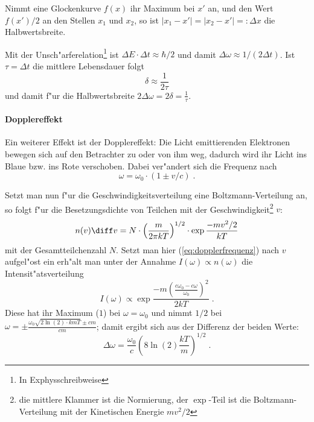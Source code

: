 \documentclass[a4paper,draft]{article}
\begin{document}
\begin{Def}
  [Halbwertsbreite]
Nimmt eine Glockenkurve $f(x)$ ihr Maximum bei $x'$ an, und den Wert
$f(x')/2$ an den Stellen $x_1$ und $x_2$, so ist $|x_1-x'| = |x_2-x'|
=: \Delta x$ die Halbwertsbreite.
\end{Def}

Mit der Unsch"arferelation\footnote{In Exphysschreibweise} ist
$\Delta  E \cdot \Delta t \approx \hbar / 2$ und damit $\Delta
\omega \approx 1/(2\Delta t)$. Ist $\tau = \Delta t $ die mittlere
Lebensdauer folgt 
\begin{equation}
  \label{eq:12}
  \delta \approx \frac{1}{2 \tau}  
\end{equation}
 und damit f"ur die Halbwertsbreite $2\Delta \omega = 2\delta = \frac{1}{\tau}$.



\paragraph{Dopplereffekt}
\label{sec:dopplereffekt}

Ein weiterer Effekt ist der Dopplereffekt: Die Licht emittierenden
Elektronen bewegen sich auf den Betrachter zu oder von ihm weg,
dadurch wird ihr Licht ins Blaue bzw. ins Rote verschoben. Dabei
ver"andert sich die Frequenz nach
\begin{equation}
  \label{eq:dopplerfrequenz}
  \omega = \omega_0 \cdot (1 \pm v/c) \;.
\end{equation}

Setzt man nun f"ur die Geschwindigkeitsverteilung eine
Boltzmann-Verteilung an, so folgt f"ur die Besetzungsdichte von
Teilchen mit der Geschwindigkeit\footnote{die mittlere Klammer ist die
Normierung, der $\exp$-Teil ist die Boltzmann-Verteilung mit der
Kinetischen Energie $mv^2/2$} $v$:
\begin{equation*}
  n(v) \diff v = N \cdot \left ( \frac{m}{2\pi k T} \right )^{1/2}
  \cdot \exp\frac{-mv^2 / 2}{kT} 
\end{equation*}
mit der Gesamtteilchenzahl $N$. Setzt man hier
(\ref{eq:dopplerfrequenz}) nach $v$ aufgel"ost ein erh"alt man unter
der Annahme $I(\omega) \propto n(\omega)$ die Intensit"atsverteilung
\begin{equation*}
  I(\omega) \propto \exp \frac{-m  \left ( \frac{c\omega_0 -
        c\omega}{\omega_0} \right )^2}{2kT} \;.
\end{equation*}
Diese hat ihr Maximum ($1$) bei $\omega = \omega_0$ und nimmt $1/2$
bei $\omega = \pm \frac{ \omega_0 \sqrt{2\ln(2) \cdot k m T} \pm c
  m}{c m}$; damit ergibt sich aus der Differenz der beiden Werte:
\begin{equation}
  \label{eq:14}
  \Delta \omega = \frac{\omega_0}{c} \left ( 8\ln(2) \frac{kT}{m}
  \right )^{1/2} \;.
\end{equation}
\end{document}
